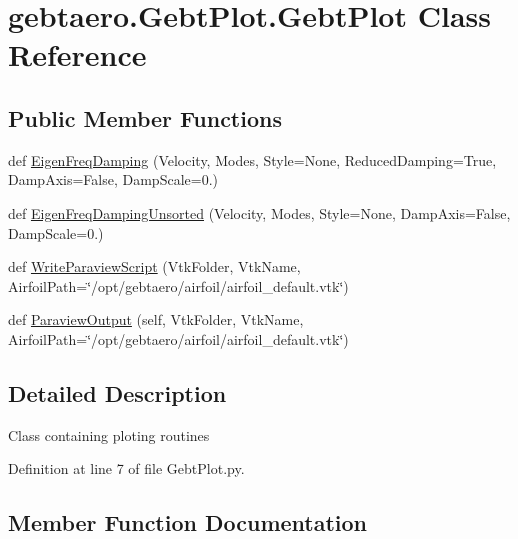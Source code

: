 \hypertarget{classgebtaero_1_1_gebt_plot_1_1_gebt_plot}{}\section{gebtaero.\+Gebt\+Plot.\+Gebt\+Plot Class Reference}
\label{classgebtaero_1_1_gebt_plot_1_1_gebt_plot}
\subsection*{Public Member Functions}
\begin{DoxyCompactItemize}
\item 
def \hyperlink{classgebtaero_1_1_gebt_plot_1_1_gebt_plot_ab23ba97ff26906e6af80bff4e068327a}{Eigen\+Freq\+Damping} (Velocity, Modes, Style=None, Reduced\+Damping=True, Damp\+Axis=False, Damp\+Scale=0.)
\item 
def \hyperlink{classgebtaero_1_1_gebt_plot_1_1_gebt_plot_a3c71db3cc350d3befddb115ade755867}{Eigen\+Freq\+Damping\+Unsorted} (Velocity, Modes, Style=None, Damp\+Axis=False, Damp\+Scale=0.)
\item 
def \hyperlink{classgebtaero_1_1_gebt_plot_1_1_gebt_plot_aada9da700e97eef6c59a4377098954af}{Write\+Paraview\+Script} (Vtk\+Folder, Vtk\+Name, Airfoil\+Path=\char`\"{}/opt/gebtaero/airfoil/airfoil\+\_\+default.\+vtk\char`\"{})
\item 
def \hyperlink{classgebtaero_1_1_gebt_plot_1_1_gebt_plot_ae78de8134989ce474d9a7d32b6f7e7c9}{Paraview\+Output} (self, Vtk\+Folder, Vtk\+Name, Airfoil\+Path=\char`\"{}/opt/gebtaero/airfoil/airfoil\+\_\+default.\+vtk\char`\"{})
\end{DoxyCompactItemize}


\subsection{Detailed Description}
\begin{DoxyVerb}Class containing ploting routines
\end{DoxyVerb}
 

Definition at line 7 of file Gebt\+Plot.\+py.



\subsection{Member Function Documentation}
\mbox{\label{classgebtaero_1_1_gebt_plot_1_1_gebt_plot_ab23ba97ff26906e6af80bff4e068327a}} 
